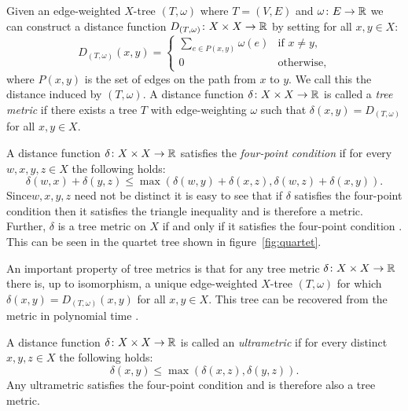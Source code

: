Given an edge-weighted $X$-tree $(T,\omega)$ where $T=(V,E)$ and $\omega
\colon E \to {\mathbb R}$ we can construct a distance function $D_{(T,\omega)} \colon
X \times X \to {\mathbb R}$ by setting for all $x,y \in X$:
\begin{equation*}
  D_{(T,\omega)}(x,y) =
  \begin{cases}
    \displaystyle
    \sum_{e \in P(x,y)} \omega(e) & \text{if $x \neq y$},\\
    0 & \text{otherwise,}
  \end{cases}
\end{equation*}
where $P(x,y)$ is the set of edges on the path from $x$ to $y$.  We call this
the distance induced by $(T,\omega)$.  A distance function $\delta \colon X
\times X \to {\mathbb R}$ is called a \textit{tree metric} if there exists a tree $T$
with edge-weighting $\omega$ such that $\delta(x,y) = D_{(T,\omega)}$ for all
$x,y \in X$.

A distance function $\delta \colon X \times X \to {\mathbb R}$ satisfies the
\textit{four-point condition} if for every $w,x,y,z \in X$ the following
holds:
\begin{equation*}
  \delta(w,x) + \delta(y,z) \leq \max(\delta(w,y)+\delta(x,z),
                                      \delta(w,z)+\delta(x,y)).
\end{equation*}
Since$w,x,y,z$ need not be distinct it is easy to see that if $\delta$
satisfies the four-point condition then it satisfies the triangle inequality
and is therefore a metric.  Further, $\delta$ is a tree metric on $X$ if and
only if it satisfies the four-point condition \citep{semple2003phylogenetics}.
This can be seen in the quartet tree shown in figure~\ref{fig:quartet}.

An important property of tree metrics is that for any tree metric $\delta
\colon X \times X \to {\mathbb R}$ there is, up to isomorphism, a unique edge-weighted
$X$-tree $(T,\omega)$ for which $\delta(x,y) = D_{(T,\omega)}(x,y)$ for all
$x,y \in X$.  This tree can be recovered from the metric in polynomial time
\citep{semple2003phylogenetics}.

A distance function $\delta \colon X \times X \to {\mathbb R}$ is called an
\textit{ultrametric} if for every distinct $x,y,z \in X$ the following holds:
\begin{equation*}
  \delta(x,y) \leq \max(\delta(x,z),\delta(y,z)).
\end{equation*}
Any ultrametric satisfies the four-point condition and is therefore also a
tree metric.

